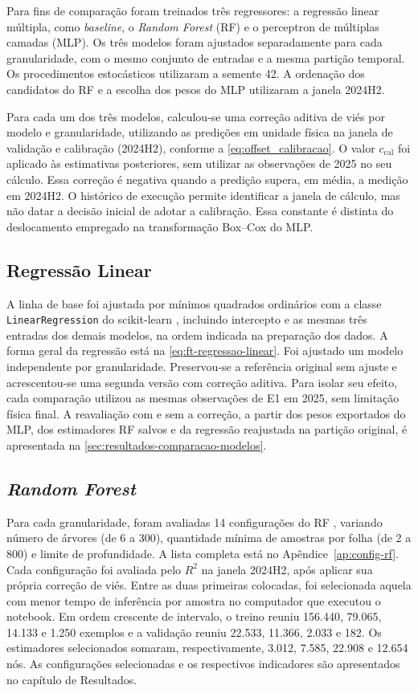 Para fins de comparação foram treinados três regressores: a regressão linear
múltipla, como \textit{baseline}, o \textit{Random Forest} (RF) e o perceptron de
múltiplas camadas (MLP). Os três modelos foram ajustados separadamente para
cada granularidade, com o mesmo conjunto de entradas e a mesma partição
temporal. Os procedimentos estocásticos utilizaram a semente 42. A ordenação
dos candidatos do RF e a escolha dos pesos do MLP utilizaram a janela
2024H2.

Para cada um dos três modelos, calculou-se uma correção aditiva de viés por
modelo e granularidade, utilizando as predições em unidade física na janela
de validação e calibração (2024H2), conforme a \cref{eq:offset_calibracao}.
O valor $c_{\mathrm{cal}}$ foi aplicado às estimativas posteriores, sem
utilizar as observações de 2025 no seu cálculo. Essa correção é negativa
quando a predição supera, em média, a medição em 2024H2. O histórico de
execução permite identificar a janela de cálculo, mas não datar a decisão
inicial de adotar a calibração. Essa constante é distinta do deslocamento
empregado na transformação Box--Cox do MLP.

\subsection{Regressão Linear}

A linha de base foi ajustada por mínimos quadrados ordinários com a classe
\texttt{LinearRegression} do scikit-learn \cite{pedregosa2011}, incluindo
intercepto e as mesmas três entradas dos demais modelos, na ordem indicada
na preparação dos dados. A forma geral da regressão está na
\cref{eq:ft-regressao-linear}. Foi ajustado um modelo independente por
granularidade. Preservou-se a referência original sem ajuste e
acrescentou-se uma segunda versão com correção aditiva. Para isolar seu
efeito, cada comparação utilizou as mesmas observações de E1 em 2025, sem
limitação física final. A reavaliação com e sem a correção, a partir dos pesos exportados do MLP, dos
estimadores RF salvos e da regressão reajustada na partição original, é
apresentada na \cref{sec:resultados-comparacao-modelos}.

\subsection{\textit{Random Forest}}

Para cada granularidade, foram avaliadas 14 configurações do RF
\cite{breiman2001}, variando número de árvores (de 6 a 300), quantidade
mínima de amostras por folha (de 2 a 800) e limite de profundidade. A lista
completa está no Apêndice~\ref{ap:config-rf}. Cada configuração foi avaliada
pelo $R^2$ na janela 2024H2, após aplicar sua própria correção de viés. Entre
as duas primeiras colocadas, foi selecionada aquela com menor tempo de
inferência por amostra no computador que executou o notebook. Em ordem
crescente de intervalo, o treino reuniu 156.440, 79.065, 14.133 e 1.250
exemplos e a validação reuniu 22.533, 11.366, 2.033 e 182. Os estimadores
selecionados somaram, respectivamente, 3.012, 7.585, 22.908 e 12.654 nós. As
configurações selecionadas e os respectivos indicadores são apresentados no
capítulo de Resultados.

